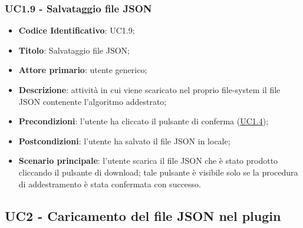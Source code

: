 	\label{par:UC1.9}
	\subsubsection{UC1.9 - Salvataggio file JSON}
		\begin{itemize}
			\item\textbf{Codice Identificativo}: UC1.9;
			\item\textbf{Titolo}: Salvataggio file JSON;
			\item\textbf{Attore primario}: utente generico;
			\item\textbf{Descrizione}: attività in cui viene scaricato nel proprio file-system il file JSON contenente l'algoritmo addestrato;
			\item\textbf{Precondizioni}: l'utente ha cliccato il pulsante di conferma (\hyperref[par:UC1.4]{UC1.4});
			\item\textbf{Postcondizioni}: l'utente ha salvato il file JSON in locale;
			\item\textbf{Scenario principale}: l'utente scarica il file JSON che è stato prodotto cliccando il pulsante di download; tale pulsante è visibile solo se la procedura di addestramento è stata confermata con successo. 	
			
			 	
		\end{itemize}


	\label{par:UC2}
	\subsection{UC2 - Caricamento del file JSON nel plugin}
	
		
